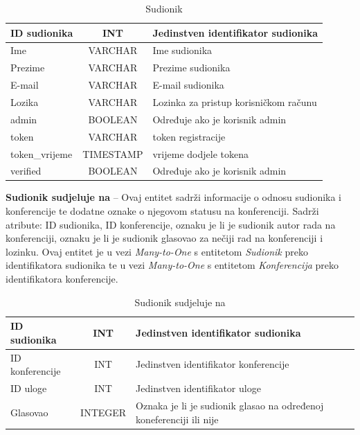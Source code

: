 \begin{table}[H]
	\caption{Sudionik}
	\label{tbl:sudionik}
	\centering
	\begin{tabular}{|l|c|l|} 
		\hline
		\cellcolor{lightgreen}ID sudionika & INT & Jedinstven identifikator sudionika\\ 
		\hline
		Ime & VARCHAR & Ime sudionika\\ 
		\hline
		Prezime & VARCHAR & Prezime sudionika\\ 
		\hline
		E-mail & VARCHAR & E-mail sudionika\\ 
		\hline
		Lozika & VARCHAR & Lozinka za pristup korisničkom računu\\ 
		\hline
		admin & BOOLEAN & Određuje ako je korisnik admin\\ 
		\hline
		token & VARCHAR & token registracije\\ 
		\hline
		token_vrijeme & TIMESTAMP & vrijeme dodjele tokena\\ 
		\hline
		verified & BOOLEAN & Određuje ako je korisnik admin\\ 
		\hline
	\end{tabular}
\end{table}

\textbf{Sudionik sudjeluje na} – Ovaj entitet sadrži informacije o odnosu sudionika i konferencije te dodatne oznake o njegovom statusu na konferenciji. Sadrži atribute: ID sudionika, ID konferencije, oznaku je li je sudionik autor rada na konferenciji, oznaku je li je sudionik glasovao za nečiji rad na konferenciji i lozinku. Ovaj entitet je u vezi \textit{Many-to-One} s entitetom \textit{Sudionik} preko identifikatora sudionika te u vezi \textit{Many-to-One} s entitetom \textit{Konferencija} preko identifikatora konferencije.

\begin{table}[H]
	\caption{Sudionik sudjeluje na}
	\label{tbl:sudionikSudjelujeNa}
	\centering
	\begin{tabular}{|l|c|l|} 
		\hline
		\cellcolor{lightblue}ID sudionika & INT & Jedinstven identifikator sudionika\\ 
		\hline
		\cellcolor{lightblue}ID konferencije & INT & Jedinstven identifikator konferencije\\ 
		\hline
		\cellcolor{lightblue}ID uloge & INT & Jedinstven identifikator uloge\\ 
		\hline
		Glasovao & INTEGER & Oznaka je li je sudionik glasao na određenoj koneferenciji ili nije\\ 
		\hline
	\end{tabular}
\end{table}

